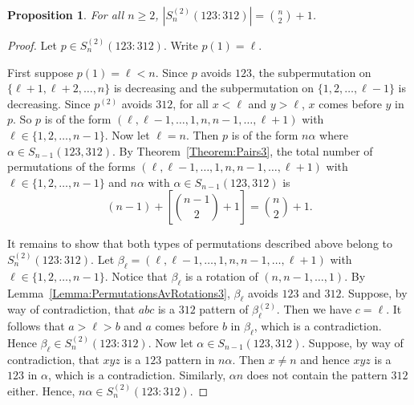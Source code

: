 \documentclass[11pt]{article}
\newtheorem{proposition}[theorem]{Proposition}
\theoremstyle{definition}
\numberwithin{equation}{section}
\begin{document}
\begin{proposition}
For all $n\geq2$, $|S_n^{(2)}(123:312)|=\binom{n}{2}+1$.
\end{proposition}
\begin{proof}
    Let $p\in S_n^{(2)}(123:312)$. Write $p(1)=\ell$. 
    
    First suppose $p(1)=\ell<n$. Since $p$ avoids $123$, the subpermutation on $\{\ell+1,\ell+2,\ldots,n\}$ is decreasing and the subpermutation on $\{1,2,\ldots,\ell-1\}$ is decreasing. Since $p^{(2)}$ avoids $312$, for all $x<\ell$ and $y>\ell$, $x$ comes before $y$ in $p$. So $p$ is of the form $(\ell,\ell-1,\ldots,1,n,n-1,\ldots,\ell+1)$ with $\ell\in\{1,2,\ldots,n-1\}$. Now let $\ell=n$. Then $p$ is of the form $n\alpha$ where $\alpha\in S_{n-1}(123,312)$. By Theorem~\ref{Theorem:Pairs3}, the total number of permutations of the forms $(\ell,\ell-1,\ldots,1,n,n-1,\ldots,\ell+1)$ with $\ell\in\{1,2,\ldots,n-1\}$ and $n\alpha$ with $\alpha\in S_{n-1}(123,312)$ is
    \[
    (n-1)+\left[\binom{n-1}{2}+1\right]=\binom{n}{2}+1.
    \]

    It remains to show that both types of permutations described above belong to $S_n^{(2)}(123:312)$. Let $\beta_\ell=(\ell,\ell-1,\ldots,1,n,n-1,\ldots,\ell+1)$ with $\ell\in\{1,2,\ldots,n-1\}$. Notice that $\beta_\ell$ is a rotation of $(n,n-1,\ldots,1)$. By Lemma~\ref{Lemma:PermutationsAvRotations3}, $\beta_\ell$ avoids $123$ and $312$. 
Suppose, by way of contradiction, that $abc$ is a $312$ pattern of $\beta_\ell^{(2)}$. Then we have $c=\ell$. It follows that $a>\ell>b$ and $a$ comes before $b$ in $\beta_{\ell}$, which is a contradiction. Hence $\beta_\ell\in S_n^{(2)}(123:312)$. Now let $\alpha\in S_{n-1}(123,312)$. Suppose, by way of contradiction, that $xyz$ is a $123$ pattern in $n\alpha$. Then $x\neq n$ and hence $xyz$ is a $123$ in $\alpha$, which is a contradiction. Similarly, $\alpha n$ does not contain the pattern $312$ either. Hence, $n\alpha\in S_n^{(2)}(123:312)$.
\end{proof}
\end{document}

